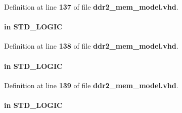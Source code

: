 Definition at line {\bf 137} of file {\bf ddr2\+\_\+mem\+\_\+model.\+vhd}.

\paragraph[{mem\+\_\+cas\+\_\+n}]{ {\bfseries \textcolor{keywordflow}{in}\textcolor{vhdlchar}{ }} {\bfseries \textcolor{comment}{S\+T\+D\+\_\+\+L\+O\+G\+IC}\textcolor{vhdlchar}{ }} \hspace{0.3cm}{\ttfamily [Port]}}\label{classddr2__mem__model_a8a9bf3b83d1ed706a8c68cd8ad88b598}


Definition at line {\bf 138} of file {\bf ddr2\+\_\+mem\+\_\+model.\+vhd}.

\paragraph[{mem\+\_\+cke}]{ {\bfseries \textcolor{keywordflow}{in}\textcolor{vhdlchar}{ }} {\bfseries \textcolor{comment}{S\+T\+D\+\_\+\+L\+O\+G\+IC}\textcolor{vhdlchar}{ }} \hspace{0.3cm}{\ttfamily [Port]}}\label{classddr2__mem__model_a20c107edb85a38c3abb4a35caff494e4}


Definition at line {\bf 139} of file {\bf ddr2\+\_\+mem\+\_\+model.\+vhd}.

\paragraph[{mem\+\_\+clk}]{ {\bfseries \textcolor{keywordflow}{in}\textcolor{vhdlchar}{ }} {\bfseries \textcolor{comment}{S\+T\+D\+\_\+\+L\+O\+G\+IC}\textcolor{vhdlchar}{ }} \hspace{0.3cm}{\ttfamily [Port]}}\label{classddr2__mem__model_ab422a875d2a922d8b5ddb85f789c6b5a}


